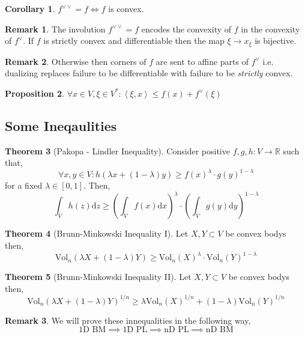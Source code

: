 \documentclass[12pt]{extarticle}
\newcommand{\R}{\mathbb{R}}
\theoremstyle{definition}
\newtheorem{theorem}{Theorem}[section]
\newtheorem{proposition}[theorem]{Proposition}
\newtheorem{corollary}[theorem]{Corollary}
\newtheorem{remark}{Remark}
\renewcommand{\d}[1]{\mathrm{d} #1}
\newcommand{\Vol}[2]{\mathrm{Vol}_{#1}\left( #2 \right)}
\newcommand{\inner}[2]{\left< #1, #2 \right>}
\begin{document}
\begin{corollary}
$f^{\vee \vee} = f \iff f$ is convex.
\end{corollary}

\begin{remark}
The involution $f^{\vee \vee} = f$ encodes the convexity of $f$ in the convexity of $f^\vee$. If $f$ is strictly convex and differentiable then the map $\xi \to x_\xi$ is bijective. 
\end{remark}

\begin{remark}
Otherwise then corners of $f$ are sent to affine parts of $f^\vee$ i.e. dualizing replaces failure to be differentiable with failure to be \textit{strictly} convex.
\end{remark}

\begin{proposition}
$\forall x \in V, \xi \in V^* : \inner{\xi}{x} \le f(x) + f^\vee(\xi)$
\end{proposition}

\subsection{Some Ineqaulities}

\begin{theorem}[Pakopa - Lindler Inequality]
Consider positive $f,g,h : V \to \R$ such that,
\[ \forall x,y \in V : h(\lambda x + (1- \lambda)y) \ge f(x)^{\lambda} \cdot g(y)^{1 - \lambda} \]
for a fixed $\lambda \in [0,1]$. Then,
\[ \int_V h(z) \d{z} \ge \left( \int_V f(x) \d{x} \right)^\lambda \cdot \left( \int_V g(y) \d{y} \right)^{1- \lambda} \]
\end{theorem}

\begin{theorem}[Brunn-Minkowski Inequality I]
Let $X, Y \subset V$ be convex bodys then,
\[ \Vol{n}{\lambda X + (1 - \lambda) Y} \ge \Vol{n}{X}^\lambda \cdot \Vol{n}{Y}^{1 - \lambda} \]
\end{theorem}

\begin{theorem}[Brunn-Minkowski Inequality II]
Let $X, Y \subset V$ be convex bodys then,
\[ \Vol{n}{\lambda X + (1 - \lambda) Y}^{1/n} \ge \lambda \Vol{n}{X}^{1/n} + (1 - \lambda) \Vol{n}{Y}^{1/n} \]
\end{theorem}

\begin{remark}
We will prove these innequalities in the following way,
\[ \text{1D BM} \implies \text{1D PL} \implies \text{nD PL} \implies \text{nD BM} \]
\end{remark}
\end{document}
